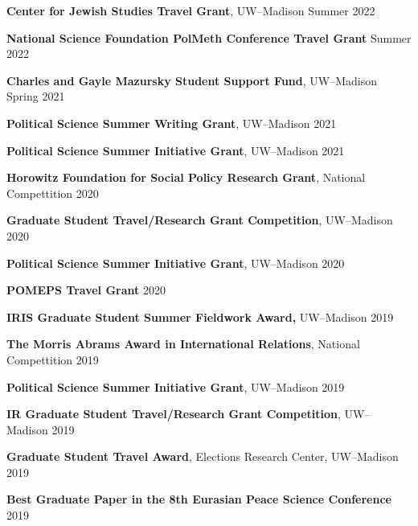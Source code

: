 \documentclass[11pt]{article}
\begin{document}
\textbf{Center for Jewish Studies Travel Grant}, UW--Madison \hfill Summer 2022 \vspace{.01in}

\textbf{National Science Foundation PolMeth Conference Travel Grant} \hfill  Summer 2022 \vspace{.01in}

\textbf{Charles and Gayle Mazursky Student Support Fund}, UW--Madison \hfill  Spring 2021 \vspace{.01in}

\textbf{Political Science Summer Writing Grant}, UW--Madison \hfill 2021\vspace{.01in}

\textbf{Political Science Summer Initiative Grant}, UW--Madison \hfill 2021\vspace{.01in}

\textbf{Horowitz Foundation for Social Policy Research Grant}, National Compettition \hfill 2020\vspace{.01in}

\textbf{Graduate Student Travel/Research Grant Competition}, UW--Madison \hfill 2020\vspace{.01in}

\textbf{Political Science Summer Initiative Grant}, UW--Madison \hfill 2020\vspace{.01in}

\textbf{POMEPS Travel Grant} \hfill 2020\vspace{.01in}

\textbf{IRIS Graduate Student Summer Fieldwork Award,} UW--Madison \hfill 2019\vspace{.01in}

\textbf{The Morris Abrams Award in International Relations}, National Compettition \hfill 2019\vspace{.01in}

\textbf{Political Science Summer Initiative Grant}, UW--Madison \hfill 2019\vspace{.01in}

\textbf{IR Graduate Student Travel/Research Grant Competition}, UW--Madison \hfill 2019\vspace{.01in}

\textbf{Graduate Student Travel Award}, Elections Research Center, UW--Madison \hfill  2019\vspace{.01in}

\textbf{Best Graduate Paper in the 8th Eurasian Peace Science Conference} \hfill  2019\vspace{.01in}
\end{document}
